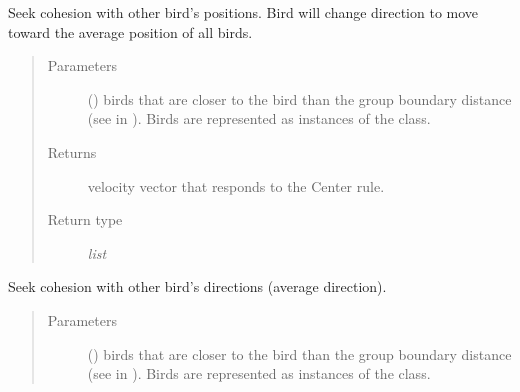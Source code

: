 \documentclass[a4paper,11pt,oneside,english]{sphinxmanual}
\begin{document}
\begin{fulllineitems}
\begin{fulllineitems}
\label{\detokenize{bird:bird.Bird.center}}
Seek cohesion with other bird’s positions.
Bird will change direction to move toward the average position of all birds.
\begin{quote}\begin{description}
\item[{Parameters}] \leavevmode
{} () \textendash{} birds that are closer to the bird than the group boundary distance (see  in {\hyperref[\detokenize{parameters:module-0}]{}}). Birds are represented as instances of the {\hyperref[\detokenize{bird:bird.Bird}]{}} class.

\item[{Returns}] \leavevmode
velocity vector that responds to the Center rule.

\item[{Return type}] \leavevmode
\textit{list}

\end{description}\end{quote}

\bigskip 
\bigskip 

\end{fulllineitems}


\begin{fulllineitems}
\label{\detokenize{bird:bird.Bird.copy}}
Seek cohesion with other bird’s directions (average direction).
\begin{quote}\begin{description}
\item[{Parameters}] \leavevmode
{} () \textendash{} birds that are closer to the bird than the group boundary distance (see  in {\hyperref[\detokenize{parameters:module-0}]{}}). Birds are represented as instances of the {\hyperref[\detokenize{bird:bird.Bird}]{}} class.


\end{description}
\end{quote}
\end{fulllineitems}
\end{fulllineitems}
\end{document}
